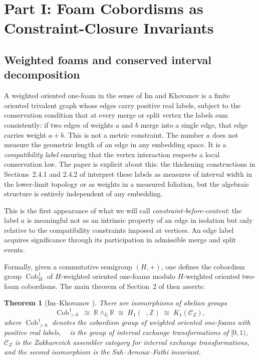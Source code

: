 \documentclass[12pt, a4paper]{article}
\theoremstyle{plain}
\newtheorem{theorem}{Theorem}[section]
\theoremstyle{definition}
\theoremstyle{correspondence}
\DeclareMathOperator{\Cob}{Cob}
\DeclareMathOperator{\AutIET}{Aut_{IET}}
\newcommand{\RR}{\mathbb{R}}
\newcommand{\QQ}{\mathbb{Q}}
\newcommand{\ZZ}{\mathbb{Z}}
\newcommand{\wedgeQ}{\wedge_{\QQ}}
\newcommand{\calC}{\mathcal{C}}
\begin{document}
\section{Part I: Foam Cobordisms as Constraint-Closure Invariants}

\subsection{Weighted foams and conserved interval decomposition}

A weighted oriented one-foam in the sense of Im and Khovanov is a finite oriented
trivalent graph whose edges carry positive real labels, subject to the conservation
condition that at every merge or split vertex the labels sum consistently: if two edges
of weights $a$ and $b$ merge into a single edge, that edge carries weight $a + b$.
This is not a metric constraint. The number $a$ does not measure the geometric length
of an edge in any embedding space. It is a \emph{compatibility label} ensuring that
the vertex interaction respects a local conservation law. The paper is explicit about
this: the thickening constructions in Sections~2.4.1 and 2.4.2 of \cite{IK24foam}
interpret these labels as measures of interval width in the lower-limit topology or as
weights in a measured foliation, but the algebraic structure is entirely independent
of any embedding.

This is the first appearance of what we will call \emph{constraint-before-content}: the
label $a$ is meaningful not as an intrinsic property of an edge in isolation but only
relative to the compatibility constraints imposed at vertices. An edge label acquires
significance through its participation in admissible merge and split events.

Formally, given a commutative semigroup $(H, +)$, one defines the cobordism group
$\Cob^1_H$ of $H$-weighted oriented one-foams modulo $H$-weighted oriented two-foam
cobordisms. The main theorem of Section~2 of \cite{IK24foam} then asserts:

\begin{theorem}[Im--Khovanov \cite{IK24foam}]
\label{thm:IK-main}
There are isomorphisms of abelian groups
\[
\Cob^1_{>0} \;\cong\; \RR \wedgeQ \RR \;\cong\; H_1(\AutIET, \ZZ) \;\cong\; K_1(\calC_Z),
\]
where $\Cob^1_{>0}$ denotes the cobordism group of weighted oriented one-foams with
positive real labels, $\AutIET$ is the group of interval exchange transformations of
$[0,1)$, $\calC_Z$ is the Zakharevich assembler category for interval exchange
transformations, and the second isomorphism is the Sah--Arnoux--Fathi invariant.
\end{theorem}
\end{document}
